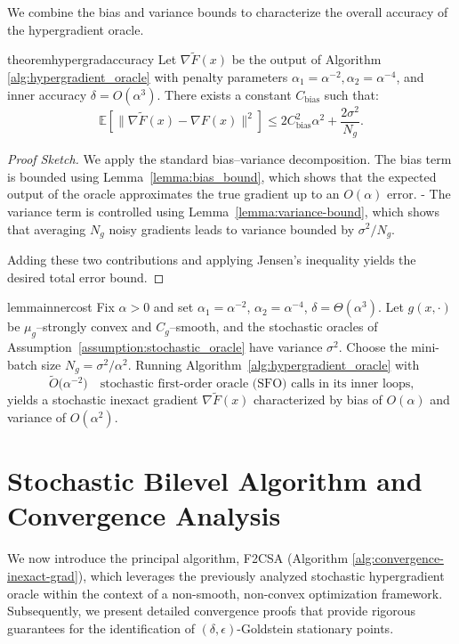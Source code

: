 \documentclass[letterpaper]{article} %
\newcommand{\1}{\mathbf{1}}
\begin{document}
We combine the bias and variance bounds to characterize the overall accuracy of the hypergradient oracle.
\begin{restatable}{theorem}{hypergradaccuracy}
\label{thm:hypergradient-accuracy}
Let $\nabla\tilde{F}(x)$ be the output of Algorithm \ref{alg:hypergradient_oracle} with penalty parameters $\alpha_1 = \alpha^{-2}, \alpha_2 = \alpha^{-4}$, and inner accuracy $\delta = O(\alpha^3)$. There exists a constant $C_{\text{bias}}$ such that:
\[
\mathbb{E}[\|\nabla\tilde{F}(x) - \nabla F(x)\|^2] \leq 2 C_{\text{bias}}^2 \alpha^2 + \frac{2 \sigma^2}{N_g}.\]
\end{restatable}
\begin{proof}[Proof Sketch]
We apply the standard bias–variance decomposition. The bias term is bounded using Lemma~\ref{lemma:bias_bound}, which shows that the expected output of the oracle approximates the true gradient up to an $O(\alpha)$ error.
- The variance term is controlled using Lemma~\ref{lemma:variance-bound}, which shows that averaging $N_g$ noisy gradients leads to variance bounded by $\sigma^2 / N_g$.

Adding these two contributions and applying Jensen’s inequality yields the desired total error bound.
\end{proof}


\begin{restatable}{lemma}{innercost}
\label{lem:inner-cost}
Fix $\alpha>0$ and set
$\alpha_1=\alpha^{-2}$, $\alpha_2=\alpha^{-4}$, $\delta=\Theta(\alpha^{3})$.
Let $g(x,\cdot)$ be $\mu_g$–strongly convex and $C_g$–smooth, and
the stochastic oracles of Assumption~\ref{assumption:stochastic_oracle} have variance $\sigma^{2}$.
Choose the mini-batch size $N_g=\sigma^{2}/\alpha^{2}$.
Running Algorithm~\ref{alg:hypergradient_oracle} with 
\[
\tilde O\!\bigl(\alpha^{-2}\bigr)
\quad\text{stochastic first-order oracle (SFO) calls in its inner loops,} 
\]
yields a stochastic inexact gradient $\nabla\tilde{F}(x)$ characterized by bias of \(O(\alpha)\) and variance of \(O(\alpha^2)\).
\end{restatable}

\section{Stochastic Bilevel Algorithm and Convergence Analysis}

\label{sec:algorithm_convergence}
We now introduce the principal algorithm, F2CSA (Algorithm \ref{alg:convergence-inexact-grad}), which leverages the previously analyzed stochastic hypergradient oracle within the context of a non-smooth, non-convex optimization framework. Subsequently, we present detailed convergence proofs that provide rigorous guarantees for the identification of $(\delta, \epsilon)$-Goldstein stationary points.
\end{document}
